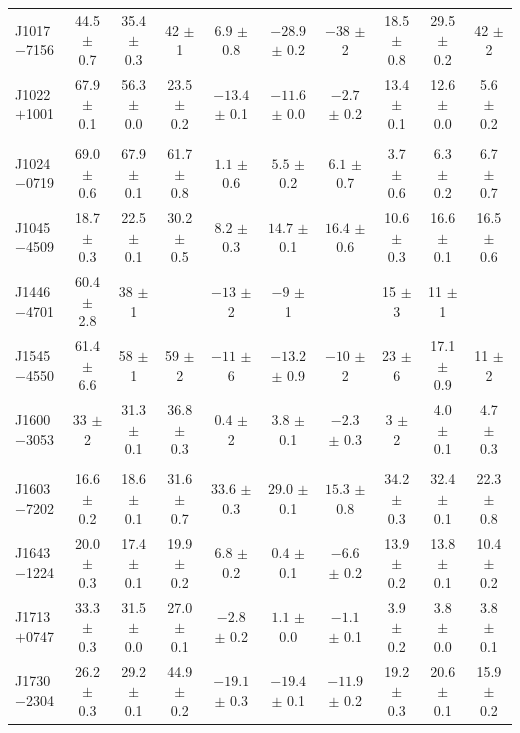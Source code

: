 \documentclass[useAMS,usenatbib]{mn2e}
\begin{document}
\begin{table}
\begin{center}
\begin{tabular}{lccccccccc}
J1017$-$7156& 44.5 $\pm$ 0.7& 35.4 $\pm $ 0.3& 42   $\pm$ 1  &$  6.9$ $\pm$ 0.8 &$-28.9$ $\pm$ 0.2 &$ -38 $ $\pm$ 2   & 18.5 $\pm$ 0.8 & 29.5 $\pm$ 0.2 & 42   $\pm$ 2 \\
J1022$+$1001& 67.9 $\pm$ 0.1& 56.3 $\pm $ 0.0& 23.5 $\pm$ 0.2&$-13.4$ $\pm$ 0.1 &$-11.6$ $\pm$ 0.0 &$ -2.7$ $\pm$ 0.2 & 13.4 $\pm$ 0.1 & 12.6 $\pm$ 0.0 & 5.6  $\pm$ 0.2 \\
            &               &                &               &                &                &                &                &                &                \\
J1024$-$0719& 69.0 $\pm$ 0.6& 67.9 $\pm $ 0.1& 61.7 $\pm$ 0.8&$ 1.1 $ $\pm$ 0.6 &$  5.5$ $\pm$ 0.2 &$ 6.1 $ $\pm$ 0.7 &  3.7 $\pm$ 0.6 &  6.3 $\pm$ 0.2 & 6.7  $\pm$ 0.7 \\
J1045$-$4509& 18.7 $\pm$ 0.3& 22.5 $\pm $ 0.1& 30.2 $\pm$ 0.5&$ 8.2 $ $\pm$ 0.3 &$ 14.7$ $\pm$ 0.1 &$ 16.4$ $\pm$ 0.6 & 10.6 $\pm$ 0.3 & 16.6 $\pm$ 0.1 & 16.5 $\pm$ 0.6 \\
J1446$-$4701& 60.4 $\pm$ 2.8& 38   $\pm $ 1  &               &$ -13 $ $\pm$ 2   &$ -9  $ $\pm$ 1   &                  &  15  $\pm$ 3   &   11 $\pm$ 1   &                \\
J1545$-$4550& 61.4 $\pm$ 6.6& 58   $\pm $ 1  & 59   $\pm$ 2  &$ -11 $ $\pm$ 6   &$-13.2$ $\pm$ 0.9 &$ -10 $ $\pm$ 2   &   23 $\pm$ 6   & 17.1 $\pm$ 0.9 & 11   $\pm$ 2 \\
J1600$-$3053& 33   $\pm$ 2  & 31.3 $\pm $ 0.1& 36.8 $\pm$ 0.3&$ 0.4 $ $\pm$ 2   &$  3.8$ $\pm$ 0.1 &$ -2.3$ $\pm$ 0.3 &    3 $\pm$ 2   &  4.0 $\pm$ 0.1 & 4.7  $\pm$ 0.3 \\
            &               &                &               &                  &                  &                  &                &                &       \\
J1603$-$7202& 16.6 $\pm$ 0.2& 18.6 $\pm $ 0.1& 31.6 $\pm$ 0.7&$33.6 $ $\pm$ 0.3 &$ 29.0$ $\pm$ 0.1 &$ 15.3$ $\pm$ 0.8 & 34.2 $\pm$ 0.3 & 32.4 $\pm$ 0.1 & 22.3 $\pm$ 0.8 \\
J1643$-$1224& 20.0 $\pm$ 0.3& 17.4 $\pm $ 0.1& 19.9 $\pm$ 0.2&$ 6.8 $ $\pm$ 0.2 &$  0.4$ $\pm$ 0.1 &$ -6.6$ $\pm$ 0.2 & 13.9 $\pm$ 0.2 & 13.8 $\pm$ 0.1 & 10.4 $\pm$ 0.2 \\
J1713$+$0747& 33.3 $\pm$ 0.3& 31.5 $\pm $ 0.0& 27.0 $\pm$ 0.1&$-2.8 $ $\pm$ 0.2 &$  1.1$ $\pm$ 0.0 &$ -1.1$ $\pm$ 0.1 &  3.9 $\pm$ 0.2 &  3.8 $\pm$ 0.0 & 3.8  $\pm$ 0.1 \\
J1730$-$2304& 26.2 $\pm$ 0.3& 29.2 $\pm $ 0.1& 44.9 $\pm$ 0.2&$-19.1$ $\pm$ 0.3 &$-19.4$ $\pm$ 0.1 &$-11.9$ $\pm$ 0.2 & 19.2 $\pm$ 0.3 & 20.6 $\pm$ 0.1 & 15.9 $\pm$ 0.2 \\

\end{tabular}
\end{center}
\end{table}
\end{document}
